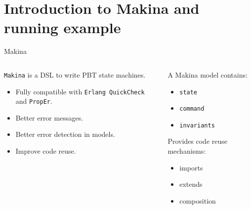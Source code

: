 \documentclass[aspectratio=169, 10pt]{beamer}
\begin{document}
\section{Introduction to Makina and running example}
\label{sec:orgea08656}
\begin{frame}[label={sec:orgaafd2a3},fragile]{Makina}
 \begin{columns}
\begin{column}{0.48\columnwidth}
\onslide<+->
\texttt{Makina} is a DSL to write PBT state machines.
\vspace{10pt}
\onslide<+->
\begin{itemize}
\item Fully compatible with \texttt{Erlang QuickCheck} and \texttt{PropEr}.
\onslide<+->
\item Better error messages.
\onslide<+->
\item Better error detection in models.
\onslide<+->
\item Improve code reuse.
\end{itemize}
\end{column}

\begin{column}{0.48\columnwidth}
\onslide<+->
A Makina model contains:
\onslide<+->
\begin{itemize}
\item \texttt{state}
\onslide<+->
\item \texttt{command}
\onslide<+->
\item \texttt{invariants}
\onslide<+->
\end{itemize}

\vspace{10pt}

Provides code reuse mechanisms:
\onslide<+->
\begin{itemize}
\item imports
\onslide<+->
\item extends
\onslide<+->
\item composition
\end{itemize}
\end{column}
\end{columns}
\end{frame}
\end{document}
